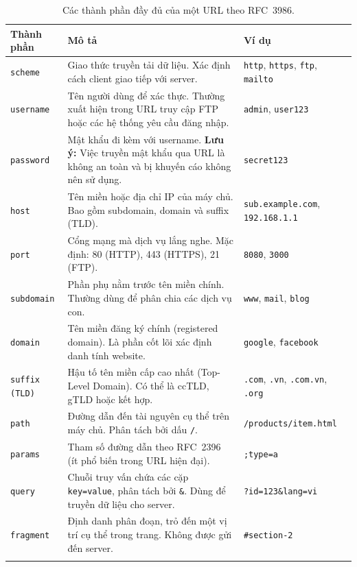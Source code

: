 \documentclass[a4paper,12pt]{article}
\begin{document}
\begin{longtable}{>{\raggedright}p{3.5cm}p{4cm}p{5.5cm}}
\toprule
\textbf{Thành phần} & \textbf{Mô tả} & \textbf{Ví dụ} \\
\midrule
\endhead
\texttt{scheme} & Giao thức truyền tải dữ liệu. Xác định cách client giao tiếp với server. & \texttt{http}, \texttt{https}, \texttt{ftp}, \texttt{mailto} \\
\texttt{username} & Tên người dùng để xác thực. Thường xuất hiện trong URL truy cập FTP hoặc các hệ thống yêu cầu đăng nhập. & \texttt{admin}, \texttt{user123} \\
\texttt{password} & Mật khẩu đi kèm với username. \textbf{Lưu ý:} Việc truyền mật khẩu qua URL là không an toàn và bị khuyến cáo không nên sử dụng. & \texttt{secret\@123} \\
\texttt{host} & Tên miền hoặc địa chỉ IP của máy chủ. Bao gồm subdomain, domain và suffix (TLD). & \texttt{sub.example.com}, \texttt{192.168.1.1} \\
\texttt{port} & Cổng mạng mà dịch vụ lắng nghe. Mặc định: 80 (HTTP), 443 (HTTPS), 21 (FTP). & \texttt{8080}, \texttt{3000} \\
\texttt{subdomain} & Phần phụ nằm trước tên miền chính. Thường dùng để phân chia các dịch vụ con. & \texttt{www}, \texttt{mail}, \texttt{blog} \\
\texttt{domain} & Tên miền đăng ký chính (registered domain). Là phần cốt lõi xác định danh tính website. & \texttt{google}, \texttt{facebook} \\
\texttt{suffix (TLD)} & Hậu tố tên miền cấp cao nhất (Top-Level Domain). Có thể là ccTLD, gTLD hoặc kết hợp. & \texttt{.com}, \texttt{.vn}, \texttt{.com.vn}, \texttt{.org} \\
\texttt{path} & Đường dẫn đến tài nguyên cụ thể trên máy chủ. Phân tách bởi dấu \texttt{/}. & \texttt{/products/item.html} \\
\texttt{params} & Tham số đường dẫn theo RFC~2396 (ít phổ biến trong URL hiện đại). & \texttt{;type=a} \\
\texttt{query} & Chuỗi truy vấn chứa các cặp \texttt{key=value}, phân tách bởi \texttt{\&}. Dùng để truyền dữ liệu cho server. & \texttt{?id=123\&lang=vi} \\
\texttt{fragment} & Định danh phân đoạn, trỏ đến một vị trí cụ thể trong trang. Không được gửi đến server. & \texttt{\#section-2} \\
\bottomrule
\caption{Các thành phần đầy đủ của một URL theo RFC~3986.}
\label{tab:url_full_components}
\end{longtable}
\end{document}
